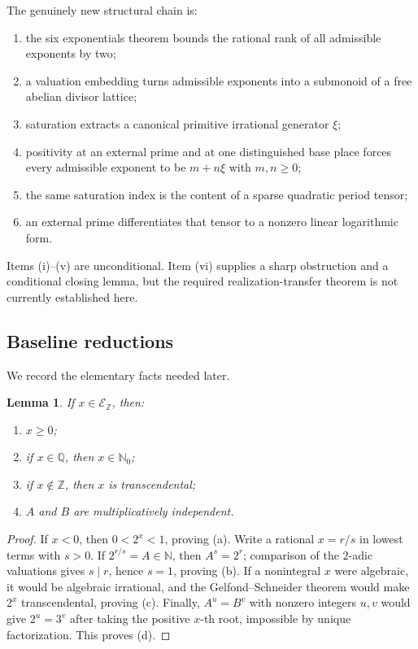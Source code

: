 \documentclass[11pt]{article}
\newtheorem{lemma}[theorem]{Lemma}
\theoremstyle{definition}
\newcommand{\Q}{\mathbb{Q}}
\newcommand{\Z}{\mathbb{Z}}
\newcommand{\N}{\mathbb{N}}
\newcommand{\Eint}{\mathcal E_{\!\Z}}
\begin{document}
The genuinely new structural chain is:
\begin{enumerate}[label=(\roman*),leftmargin=2.4em]
\item the six exponentials theorem bounds the rational rank of all admissible exponents by two;
\item a valuation embedding turns admissible exponents into a submonoid of a free abelian divisor lattice;
\item saturation extracts a canonical primitive irrational generator \(\xi\);
\item positivity at an external prime and at one distinguished base place forces every admissible exponent to be \(m+n\xi\) with \(m,n\ge0\);
\item the same saturation index is the content of a sparse quadratic period tensor;
\item an external prime differentiates that tensor to a nonzero linear logarithmic form.
\end{enumerate}
Items (i)--(v) are unconditional.  Item (vi) supplies a sharp obstruction and a conditional closing lemma, but the required realization-transfer theorem is not currently established here.

\subsection{Baseline reductions}

We record the elementary facts needed later.

\begin{lemma}\label{lem:baseline}
If \(x\in\Eint\), then:
\begin{enumerate}[label=(\alph*)]
\item \(x\ge0\);
\item if \(x\in\Q\), then \(x\in\N_0\);
\item if \(x\notin\Z\), then \(x\) is transcendental;
\item \(A\) and \(B\) are multiplicatively independent.
\end{enumerate}
\end{lemma}

\begin{proof}
If \(x<0\), then \(0<2^x<1\), proving (a).  Write a rational \(x=r/s\) in lowest terms with \(s>0\).  If \(2^{r/s}=A\in\N\), then \(A^s=2^r\); comparison of the \(2\)-adic valuations gives \(s\mid r\), hence \(s=1\), proving (b).  If a nonintegral \(x\) were algebraic, it would be algebraic irrational, and the Gelfond--Schneider theorem would make \(2^x\) transcendental, proving (c).  Finally, \(A^u=B^v\) with nonzero integers \(u,v\) would give \(2^u=3^v\) after taking the positive \(x\)-th root, impossible by unique factorization.  This proves (d).
\end{proof}
\end{document}
